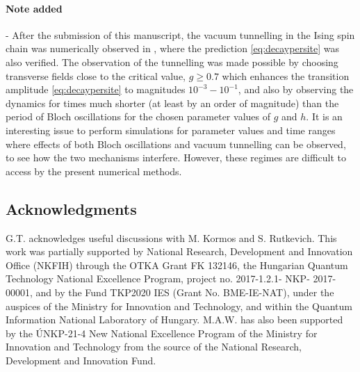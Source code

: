 \documentclass[amsmath,amssymb,11pt]{article}
\numberwithin{equation}{section}
\numberwithin{figure}{section}
\numberwithin{table}{section}
\begin{document}
\paragraph*{Note added} - {After the submission of this manuscript, the vacuum tunnelling in the Ising spin chain was numerically observed in \cite{PhysRevB.104.L201106}, where the prediction \eqref{eq:decaypersite} was also verified. The observation of the tunnelling was made possible by choosing transverse fields close to the critical value, $g\geq 0.7$ which enhances the transition amplitude \eqref{eq:decaypersite} to magnitudes $10^{-3}-10^{-1}$, and also by observing the dynamics for times much shorter (at least by an order of magnitude) than the period of Bloch oscillations for the chosen parameter values of $g$ and $h$. It is an interesting issue to perform simulations for parameter values and time ranges where effects of both Bloch oscillations and vacuum tunnelling can be observed, to see how the two mechanisms interfere. However, these regimes are difficult to access by the present numerical methods.} 

\subsection*{Acknowledgments}
{G.T. acknowledges useful discussions with M. Kormos and S. Rutkevich.} This work was partially supported by National Research, Development and Innovation Office (NKFIH) through  the OTKA Grant FK 132146, the Hungarian Quantum Technology National Excellence Program, project no. 2017-1.2.1- NKP- 2017-00001, and by the Fund TKP2020 IES (Grant No. BME-IE-NAT), under the auspices of the Ministry for Innovation and Technology, {and within the Quantum Information National Laboratory of Hungary.} M.A.W. has also been supported by the ÚNKP-21-4 New National Excellence Program of the Ministry for Innovation and Technology from the source of the National Research, Development and Innovation Fund.




\appendix
\end{document}

